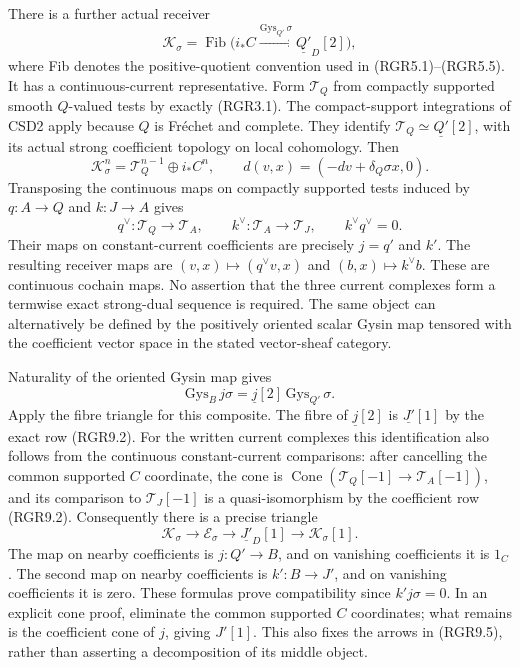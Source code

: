 There is a further actual receiver \[
 \mathscr K_\sigma=\operatorname{Fib}
 \bigl(i_*C\xrightarrow{\mathrm{Gys}_{Q'}\,\sigma}
                 \underline{Q'}_D[2]\bigr),
 \tag{RGR9.3}
\] where Fib denotes the positive-quotient convention used in
(RGR5.1)--(RGR5.5). It has a continuous-current representative. Form
\(\mathscr T_Q\) from compactly supported smooth \(Q\)-valued tests by
exactly (RGR3.1). The compact-support integrations of CSD2 apply because
\(Q\) is Fréchet and complete. They identify
\(\mathscr T_Q\simeq\underline{Q'}[2]\), with its actual strong
coefficient topology on local cohomology. Then \[
 \mathscr K_\sigma^n=\mathscr T_Q^{n-1}\oplus i_*C^n,
 \qquad d(v,x)=(-dv+\delta_Q\sigma x,0).
 \tag{RGR9.3a}
\] Transposing the continuous maps on compactly supported tests induced
by \(q:A\to Q\) and \(k:J\to A\) gives \[
 q^\vee:\mathscr T_Q\to\mathscr T_A,\qquad
 k^\vee:\mathscr T_A\to\mathscr T_J,\qquad k^\vee q^\vee=0.
 \tag{RGR9.3b}
\] Their maps on constant-current coefficients are precisely \(j=q'\)
and \(k'\). The resulting receiver maps are \((v,x)\mapsto(q^\vee v,x)\)
and \((b,x)\mapsto k^\vee b\). These are continuous cochain maps. No
assertion that the three current complexes form a termwise exact
strong-dual sequence is required. The same object can alternatively be
defined by the positively oriented scalar Gysin map tensored with the
coefficient vector space in the stated vector-sheaf category.

Naturality of the oriented Gysin map gives \[
 \mathrm{Gys}_{B}\,j\sigma
 =\underline j[2]\,\mathrm{Gys}_{Q'}\,\sigma.
 \tag{RGR9.4}
\] Apply the fibre triangle for this composite. The fibre of
\(\underline j[2]\) is \(\underline{J'}[1]\) by the exact row (RGR9.2).
For the written current complexes this identification also follows from
the continuous constant-current comparisons: after cancelling the common
supported \(C\) coordinate, the cone is
\(\operatorname{Cone}(\mathscr T_Q[-1]\to\mathscr T_A[-1])\), and its
comparison to \(\mathscr T_J[-1]\) is a quasi-isomorphism by the
coefficient row (RGR9.2). Consequently there is a precise triangle \[
 \boxed{\mathscr K_\sigma\longrightarrow\mathscr E_\sigma
       \longrightarrow\underline{J'}_D[1]
       \longrightarrow\mathscr K_\sigma[1].}
 \tag{RGR9.5}
\] The map on nearby coefficients is \(j:Q'\to B\), and on vanishing
coefficients it is \(1_C\). The second map on nearby coefficients is
\(k':B\to J'\), and on vanishing coefficients it is zero. These formulas
prove compatibility since \(k'j\sigma=0\). In an explicit cone proof,
eliminate the common supported \(C\) coordinates; what remains is the
coefficient cone of \(j\), giving \(J'[1]\). This also fixes the arrows
in (RGR9.5), rather than asserting a decomposition of its middle object.

